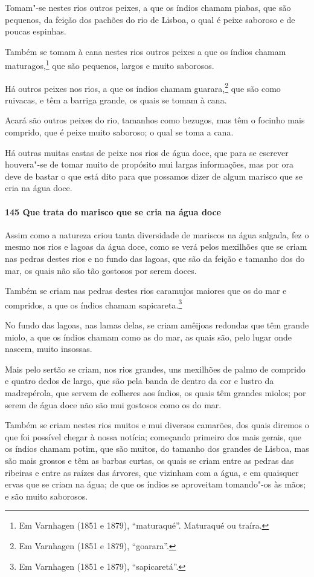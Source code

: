 Tomam"-se nestes rios outros peixes, a que os índios chamam piabas, que são pequenos, da
feição dos pachões do rio de Lisboa, o qual é peixe saboroso e de poucas espinhas.

Também se tomam à cana nestes rios outros peixes a que os índios chamam
maturagos,\footnote{ Em Varnhagen (1851 e 1879), ``maturaqué''. Maturaqué ou traíra.} que
são pequenos, largos e muito saborosos.

Há outros peixes nos rios, a que os índios chamam guarara,\footnote{ Em Varnhagen (1851 e
1879), ``goarara''.} que são como ruivacas, e têm a barriga grande, os quais se tomam à
cana.

Acará são outros peixes do rio, tamanhos como bezugos, mas têm o focinho mais comprido,
que é peixe muito saboroso; o qual se toma a cana.

Há outras muitas castas de peixe nos rios de água doce, que para se escrever houvera"-se de
tomar muito de propósito mui largas informações, mas por ora deve de bastar o que está
dito para que possamos dizer de algum marisco que se cria na água doce.

\paragraph{145 Que trata do marisco que se cria na água doce}

Assim como a natureza criou tanta diversidade de mariscos na água salgada, fez o mesmo nos
rios e lagoas da água doce, como se verá pelos mexilhões que se criam nas pedras destes
rios e no fundo das lagoas, que são da feição e tamanho dos do mar, os quais não são tão
gostosos por serem doces.

Também se criam nas pedras destes rios caramujos maiores que os do mar e compridos, a que
os índios chamam sapicareta.\footnote{ Em Varnhagen (1851 e 1879), ``sapicaretá''.}

No fundo das lagoas, nas lamas delas, se criam amêijoas redondas que têm grande miolo, a
que os índios chamam como as do mar, as quais são, pelo lugar onde nascem, muito insossas.

Mais pelo sertão se criam, nos rios grandes, uns mexilhões de palmo de comprido e quatro
dedos de largo, que são pela banda de dentro da cor e lustro da madrepérola, que servem de
colheres aos índios, os quais têm grandes miolos; por serem de água doce não são mui
gostosos como os do mar.

Também se criam nestes rios muitos e mui diversos camarões, dos quais diremos o que foi
possível chegar à nossa notícia; começando primeiro dos mais gerais, que os índios chamam
potim, que são muitos, do tamanho dos grandes de Lisboa, mas são mais grossos e têm as
barbas curtas, os quais se criam entre as pedras das ribeiras e entre as raízes das
árvores, que vizinham com a água, e em quaisquer ervas que se criam na água; de que os
índios se aproveitam tomando"-os às mãos; e são muito saborosos.

